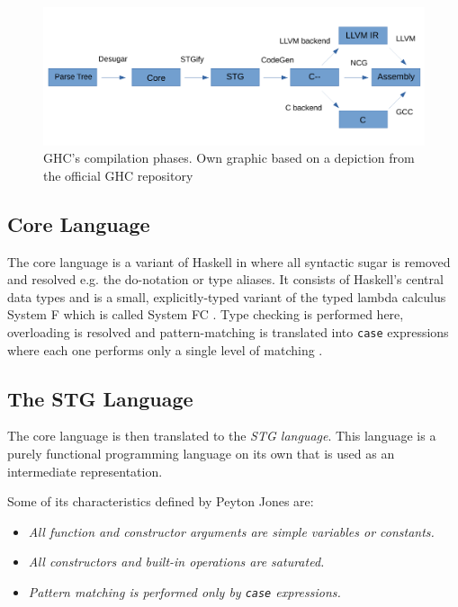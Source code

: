 \documentclass[runningheads]{llncs}
\begin{document}
\begin{figure}

\centering
\includegraphics[width=12cm]{ghcflow.pdf}
\caption{GHC's compilation phases. Own graphic based on a depiction from the official GHC repository \protect\footnotemark}
\label{fig:ghc}
\end{figure}

\subsection{Core Language}
The core language is a variant of Haskell in where all syntactic sugar is removed and resolved e.g. the do-notation or type aliases. It consists of Haskell's central data types and is a small, explicitly-typed variant of the typed lambda calculus System F \cite{girard1986system} which is called System FC \cite{sulzmann2007system}. Type checking is performed here, overloading is resolved and pattern-matching is translated into \texttt{case} expressions where each one performs only a single level of matching \cite{jones1992implementing}.

\subsection{The STG Language}
The core language is then translated to the \textit{STG language}.
This language is a purely functional programming language on its own that is used as an intermediate representation.

Some of its characteristics defined by Peyton Jones \cite{jones1992implementing} are:

\begin{itemize}
	\item[] \textit{All function and constructor arguments are simple variables or constants.}
	\item[] \textit{All constructors and built-in operations are saturated.}
	\item[] \textit{Pattern matching is performed only by \texttt{case} expressions.}
\end{itemize}
\end{document}
